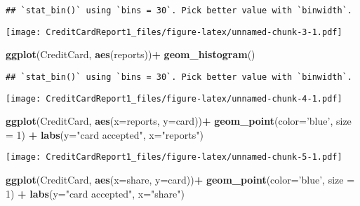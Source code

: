 \documentclass[]{article}
\newenvironment{Shaded}{\begin{snugshade}}{\end{snugshade}}
\newcommand{\DataTypeTok}[1]{\textcolor[rgb]{0.13,0.29,0.53}{#1}}
\newcommand{\DecValTok}[1]{\textcolor[rgb]{0.00,0.00,0.81}{#1}}
\newcommand{\KeywordTok}[1]{\textcolor[rgb]{0.13,0.29,0.53}{\textbf{#1}}}
\newcommand{\NormalTok}[1]{#1}
\newcommand{\OperatorTok}[1]{\textcolor[rgb]{0.81,0.36,0.00}{\textbf{#1}}}
\newcommand{\StringTok}[1]{\textcolor[rgb]{0.31,0.60,0.02}{#1}}
\begin{document}
\begin{verbatim}
## `stat_bin()` using `bins = 30`. Pick better value with `binwidth`.
\end{verbatim}

\texttt{[image: CreditCardReport1\_files/figure-latex/unnamed-chunk-3-1.pdf]}

\begin{Shaded}
\begin{Highlighting}[]
\KeywordTok{ggplot}\NormalTok{(CreditCard, }\KeywordTok{aes}\NormalTok{(reports))}\OperatorTok{+}\StringTok{ }
\StringTok{  }\KeywordTok{geom_histogram}\NormalTok{()}
\end{Highlighting}
\end{Shaded}

\begin{verbatim}
## `stat_bin()` using `bins = 30`. Pick better value with `binwidth`.
\end{verbatim}

\texttt{[image: CreditCardReport1\_files/figure-latex/unnamed-chunk-4-1.pdf]}

\begin{Shaded}
\begin{Highlighting}[]
\KeywordTok{ggplot}\NormalTok{(CreditCard, }\KeywordTok{aes}\NormalTok{(}\DataTypeTok{x=}\NormalTok{reports, }\DataTypeTok{y=}\NormalTok{card))}\OperatorTok{+}\StringTok{ }
\StringTok{  }\KeywordTok{geom_point}\NormalTok{(}\DataTypeTok{color=}\StringTok{'blue'}\NormalTok{, }\DataTypeTok{size =} \DecValTok{1}\NormalTok{) }\OperatorTok{+}\StringTok{ }
\StringTok{  }\KeywordTok{labs}\NormalTok{(}\DataTypeTok{y=}\StringTok{"card accepted"}\NormalTok{, }\DataTypeTok{x=}\StringTok{"reports"}\NormalTok{)}
\end{Highlighting}
\end{Shaded}

\texttt{[image: CreditCardReport1\_files/figure-latex/unnamed-chunk-5-1.pdf]}

\begin{Shaded}
\begin{Highlighting}[]
\KeywordTok{ggplot}\NormalTok{(CreditCard, }\KeywordTok{aes}\NormalTok{(}\DataTypeTok{x=}\NormalTok{share, }\DataTypeTok{y=}\NormalTok{card))}\OperatorTok{+}\StringTok{ }
\StringTok{  }\KeywordTok{geom_point}\NormalTok{(}\DataTypeTok{color=}\StringTok{'blue'}\NormalTok{, }\DataTypeTok{size =} \DecValTok{1}\NormalTok{) }\OperatorTok{+}\StringTok{ }
\StringTok{  }\KeywordTok{labs}\NormalTok{(}\DataTypeTok{y=}\StringTok{"card accepted"}\NormalTok{, }\DataTypeTok{x=}\StringTok{"share"}\NormalTok{)}
\end{Highlighting}
\end{Shaded}
\end{document}
